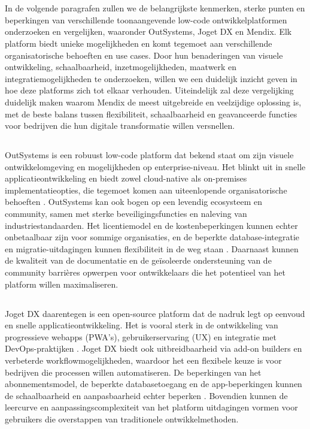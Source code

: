 \section{}%
In de volgende paragrafen zullen we de belangrijkste kenmerken, sterke punten en beperkingen van verschillende toonaangevende low-code ontwikkelplatformen onderzoeken en vergelijken, waaronder OutSystems, Joget DX en Mendix. Elk platform biedt unieke mogelijkheden en komt tegemoet aan verschillende organisatorische behoeften en use cases. Door hun benaderingen van visuele ontwikkeling, schaalbaarheid, inzetmogelijkheden, maatwerk en integratiemogelijkheden te onderzoeken, willen we een duidelijk inzicht geven in hoe deze platforms zich tot elkaar verhouden. Uiteindelijk zal deze vergelijking duidelijk maken waarom Mendix de meest uitgebreide en veelzijdige oplossing is, met de beste balans tussen flexibiliteit, schaalbaarheid en geavanceerde functies voor bedrijven die hun digitale transformatie willen versnellen.
\subsection{}
OutSystems is een robuust low-code platform dat bekend staat om zijn visuele ontwikkelomgeving en mogelijkheden op enterprise-niveau. Het blinkt uit in snelle applicatieontwikkeling en biedt zowel cloud-native als on-premises implementatieopties, die tegemoet komen aan uiteenlopende organisatorische behoeften \autocite{Sido2024}. OutSystems kan ook bogen op een levendig ecosysteem en community, samen met sterke beveiligingsfuncties en naleving van industriestandaarden. Het licentiemodel en de kostenbeperkingen kunnen echter onbetaalbaar zijn voor sommige organisaties, en de beperkte database-integratie en migratie-uitdagingen kunnen flexibiliteit in de weg staan \autocite{Sido2024}. Daarnaast kunnen de kwaliteit van de documentatie en de geïsoleerde ondersteuning van de community barrières opwerpen voor ontwikkelaars die het potentieel van het platform willen maximaliseren.
\subsection{}
Joget DX daarentegen is een open-source platform dat de nadruk legt op eenvoud en snelle applicatieontwikkeling. Het is vooral sterk in de ontwikkeling van progressieve webapps (PWA's), gebruikerservaring (UX) en integratie met DevOps-praktijken \autocite{Sido2024}. Joget DX biedt ook uitbreidbaarheid via add-on builders en verbeterde workflowmogelijkheden, waardoor het een flexibele keuze is voor bedrijven die processen willen automatiseren. De beperkingen van het abonnementsmodel, de beperkte databasetoegang en de app-beperkingen kunnen de schaalbaarheid en aanpasbaarheid echter beperken \autocite{Sido2024}. Bovendien kunnen de leercurve en aanpassingscomplexiteit van het platform uitdagingen vormen voor gebruikers die overstappen van traditionele ontwikkelmethoden.
